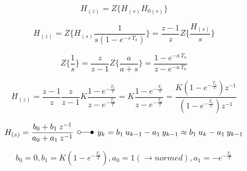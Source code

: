 \documentclass[
    10pt, %
    DIV12,
    english, %
    a5paper, %
    twoside, %
    titlepage, %
    parskip=half, %
    headings=small, %
    listof=totoc, %
    bibliography=totoc, %
    index=totoc, %
    captions=tableheading, %
    final %
]{scrbook}
\begin{document}
\begin{equation}
H_{(z)}=Z\big\{H_{(s)}  H_{0(s)} \big\} \nonumber
\end{equation}

\begin{equation}
H_{(z)}=Z\bigg\{H_{(s)}  \frac{1}{s (1-e^{-s\:T_a})}\bigg\}=\frac{z-1}{z} Z\bigg\{\frac{H_{(s)}}{s}\bigg\} \nonumber
\end{equation}

\begin{equation}
Z\bigg\{\frac{1}{s}\bigg\}=\frac{z}{z-1}
Z\bigg\{\frac{a}{a+s}\bigg\}=\frac{1-e^{-a\:T_a}}{z-e^{-a\: T_a}} \nonumber
\end{equation}

\begin{equation}
H_{(z)}=\frac{z-1}{z} \frac{z}{z-1} K \frac{1-e^{-\frac{T_a}{T}}}{z-e^{-\frac{T_a}{T}}}=K \frac{1-e^{-\frac{T_a}{T}}}{z-e^{-\frac{T_a}{T}}}= \frac{K (1-e^{-\frac{T_a}{T}}) z^{-1}}{(1-e^{-\frac{T_a}{T}}) z^{-1}} \nonumber
\end{equation}

\begin{equation}
H_{(z)}=\frac{b_0+b_1\:z^{-1}}{a_0+a_1\:z^{-1}} \:\: \laplace\:\: y_k=b_1\:u_{k-1}-a_1\:y_{k-1}\approx b_1\:u_{k}-a_1\:y_{k-1} \nonumber
\end{equation}

\begin{equation}
b_0=0, b_1=K(1-e^{-\frac{T_a}{T}}), a_0=1 (\rightarrow normed), a_1=-e^{-\frac{T_a}{T}} \nonumber
\end{equation}
\end{document}
